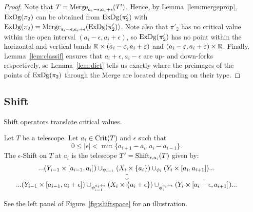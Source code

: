 \begin{proof}
Note that $T=\mathrm{Merge}_{a_i-\epsilon,a_i+\epsilon}(T')$. Hence, by
Lemma~\ref{lem:mergeprop},  $\mathrm{ExDg}(\pi_2)$ can be obtained from $\mathrm{ExDg}(\pi_2')$ 
with $\mathrm{ExDg}(\pi_2)=\mathrm{Merge}_{a_i-\epsilon,a_i+\epsilon}(\mathrm{ExDg}(\pi_2'))$.  Note also that
$\pi'_2$ has no critical value within the open interval
$(a_i-\epsilon,a_i+\epsilon)$, so $\mathrm{ExDg}(\pi'_2)$ has no point within the
horizontal and vertical bands $\mathbb{R}\times (a_i-\varepsilon, a_i+\varepsilon)$ and
$(a_i-\varepsilon, a_i+\varepsilon)\times\mathbb{R}$. Finally, Lemma~\ref{lem:classif} ensures
that $a_i+\epsilon,a_i-\epsilon$ are up- and down-forks respectively,
so Lemma~\ref{lem:dict} tells us exactly where the preimages of the
points of $\mathrm{ExDg}(\pi_2)$ through the Merge are located depending on
their type.
\end{proof}

\subsection*{Shift}
\label{sec:shift}

Shift operators translate critical values.

\begin{defin}[Shift]\label{def:shift}
Let $T$ be a telescope.
Let $a_i\in\mathrm{Crit}(T)$ and $\epsilon$ such that 
$$0\leq|\epsilon|<\displaystyle\min\{a_{i+1}-a_i,a_i-a_{i-1}\}.$$ 
The $\epsilon$-Shift on $T$ at $a_i$ is the telescope $T'=\mathrm{Shift}_{\epsilon,a_i}(T)$ given by:
%
\[\begin{array}{c}
...(Y_{i-1}\times[a_{i-1},a_i])\cup_{\psi_{i-1}}(X_i\times\{a_i\})\cup_{\phi_i}(Y_i\times[a_i,a_{i+1}])...\\
\rotatebox[origin=c]{270}{$\mapsto$}\\
...(Y_{i-1}\times[a_{i-1},a_i+\epsilon])\cup_{\psi_{i-1}^{a_i+\epsilon}}(X_i\times\{a_i+\epsilon\})\cup_{\phi_i^{a_i+\epsilon}}(Y_i\times[a_i+\epsilon,a_{i+1}])...
\end{array}\]
%
\end{defin}

See the left panel of Figure~\ref{fig:shiftspace} for an illustration. 

